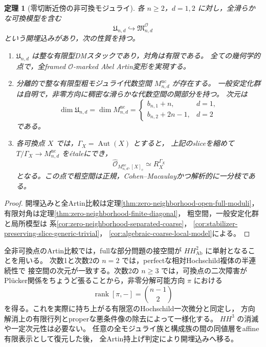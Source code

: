 \documentclass[a4paper,11pt]{ltjsarticle}
\numberwithin{equation}{section}
\theoremstyle{plain}
\newtheorem{theorem}{定理}[section]
\theoremstyle{definition}
\theoremstyle{remark}
\begin{document}
\begin{theorem}[零切断近傍の非可換モジュライ]
\label{thm:main-open-coarse-moduli}
各 $n\ge2$，$d=1,2$ に対し，全滑らかな可換模型を含む
\[
 \mathfrak U_{n,d}\hookrightarrow\mathfrak M^{\mathcal O}_{n,d}
\]
という開埋込みがあり，次の性質を持つ。
\begin{enumerate}
\item $\mathfrak U_{n,d}$ は整な有限型DMスタックであり，対角は有限である。
      全ての幾何学的点で，全framed $\mathcal O$-marked Abel Artin変形を実現する。
\item 分離的で整な有限型粗モジュライ代数空間 $M^{\mathrm{nc}}_{n,d}$ が存在する。
      一般安定化群は自明で，非零方向に稠密な滑らかな代数空間の開部分を持つ。
      次元は
      \begin{equation}\label{eq:intro-generic-moduli-dimension}
       \dim\mathfrak U_{n,d}=\dim M^{\mathrm{nc}}_{n,d}
       =\begin{cases}b_{n,1}+n,&d=1,\\b_{n,2}+2n-1,&d=2\end{cases}
      \end{equation}
      である。
\item 各可換点 $X$ では，$\Gamma_X=\operatorname{Aut}(X)$ とすると，
      上記のsliceを縮めて $T/\Gamma_X\to M^{\mathrm{nc}}_{n,d}$ を\'{e}taleにでき，
      \[
       \widehat{\mathcal O}_{M^{\mathrm{nc}}_{n,d},[X]_{\mathrm c}}
       \simeq R_X^{\Gamma_X}
      \]
      となる。この点で粗空間は正規，Cohen--Macaulayかつ解析的に一分枝である。
\end{enumerate}
\end{theorem}
\begin{proof}
開埋込みと全Artin比較は定理\ref{thm:zero-neighborhood-open-full-moduli}，
有限対角は定理\ref{thm:zero-neighborhood-finite-diagonal}，
粗空間，一般安定化群と局所模型は
系\ref{cor:zero-neighborhood-separated-coarse}，
\ref{cor:stabilizer-preserving-slice-generic-trivial}，
\ref{cor:algebraic-coarse-local-model}による。
\end{proof}

全非可換点のArtin比較では，fullな部分問題の接空間が
$HH^2_{\mathrm{Ab}}$ に単射となることを用いる。
次数1と次数2の $n=2$ では，perfectな相対Hochschild複体の半連続性で
接空間の次元が一致する。次数2の $n\ge3$ では，可換点の二次障害が
Pl\"ucker関係をちょうど張ることから，非零分解可能方向 $\pi$ における
\[
 \operatorname{rank}[\pi,-]=\binom{n-1}{2}
\]
を得る。これを実際に持ち上がる有限窓のHochschild一次微分と同定し，
方向解消上の有限行列とproperな悪条件像の除去によって一様化する。
$HH^3$ の消滅や一定次元性は必要ない。
任意の全モジュライ族と構成族の間の同値層をaffine有限表示として復元した後，
全Artin持上げ判定により開埋込みへ移る。
\end{document}
